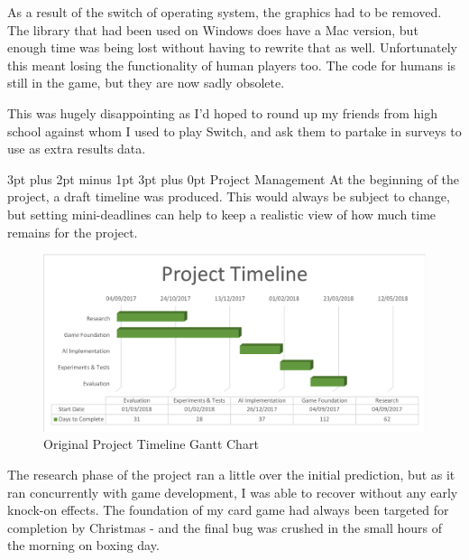 \documentclass[12pt,a4paper]{article}
\makeatletter
\renewcommand\subsection{\@startsection {subsection}{1}{2mm} %
                               {3pt plus 2pt minus 1pt} %
                               {3pt plus 0pt} %
                               {\normalfont\bfseries}}
\makeatother
\begin{document}
As a result of the switch of operating system, the graphics had to be removed. The library that had been used on Windows does have a Mac version, but enough time was being lost without having to rewrite that as well. Unfortunately this meant losing the functionality of human players too. The code for humans is still in the game, but they are now sadly obsolete. 

This was hugely disappointing as I'd hoped to round up my friends from high school against whom I used to play Switch, and ask them to partake in surveys to use as extra results data. 

\newpage
\subsection{Project Management}
At the beginning of the project, a draft timeline was produced. This would always be subject to change, but setting mini-deadlines can help to keep a realistic view of how much time remains for the project.

\begin{figure}[h]
	\centering
	\includegraphics[width = \textwidth]{Gantt1.png}
	\caption{Original Project Timeline Gantt Chart}
\end{figure}


The research phase of the project ran a little over the initial prediction, but as it ran concurrently with game development, I was able to recover without any early knock-on effects. The foundation of my card game had always been targeted for completion by Christmas - and the final bug was crushed in the small hours of the morning on boxing day. 
\end{document}
